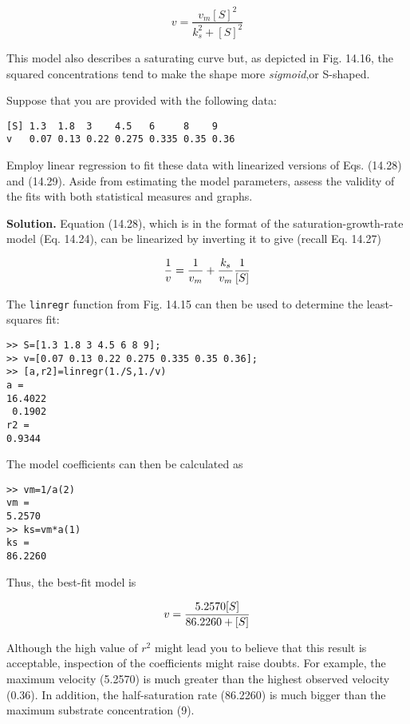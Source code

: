 \documentclass[../main.tex]{subfiles}
\begin{document}
\begin{equation}
	\tag{14.29}
	v = \frac{v_m {[S]}^2}{k^2_s + {[S]}^2}
\end{equation}

\noindent This model also describes a saturating curve but, as depicted in Fig. 14.16, the squared concentrations tend to make the shape more \textit{sigmoid},or S-shaped.

Suppose that you are provided with the following data:
\begin{lstlisting}[numbers=none] 
[S] 1.3  1.8  3    4.5   6     8    9
v   0.07 0.13 0.22 0.275 0.335 0.35 0.36
\end{lstlisting}

\noindent Employ linear regression to fit these data with linearized versions of Eqs. (14.28) and (14.29). Aside from estimating the model parameters, assess the validity of the fits with both statistical measures and graphs.

\textbf{Solution.} Equation (14.28), which is in the format of the saturation-growth-rate model (Eq. 14.24), can be linearized by inverting it to give (recall Eq. 14.27)

\begin{equation}
	\notag
	\frac{1}{v} = \frac{1}{v_m} + \frac{k_s}{v_m} \frac{1}{[S]}
\end{equation}

\noindent The \texttt{linregr} function from Fig. 14.15 can then be used to determine the least-squares fit:

\begin{lstlisting}[numbers=none] 
>> S=[1.3 1.8 3 4.5 6 8 9];
>> v=[0.07 0.13 0.22 0.275 0.335 0.35 0.36];
>> [a,r2]=linregr(1./S,1./v)
a =
16.4022
 0.1902
r2 =
0.9344
\end{lstlisting}

\noindent The model coefficients can then be calculated as

\begin{lstlisting}[numbers=none] 
>> vm=1/a(2)
vm =
5.2570
>> ks=vm*a(1)
ks =
86.2260
\end{lstlisting}

\noindent Thus, the best-fit model is

\begin{equation}
	\notag
	v = \frac{5.2570[S]}{86.2260 + [S]}
\end{equation}

Although the high value of $r^2$ might lead you to believe that this result is acceptable, inspection of the coefficients might raise doubts. For example, the maximum velocity (5.2570) is much greater than the highest observed velocity (0.36). In addition, the half-saturation rate (86.2260) is much bigger than the maximum substrate concentration (9).
\end{document}

